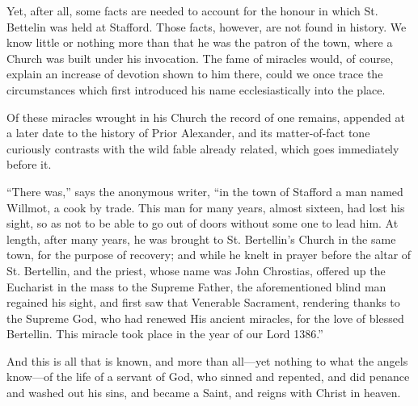 Yet, after all, some facts are needed to account
for the honour in which St. Bettelin was held at Stafford. Those
facts, however, are not found in history. We know little or nothing
more than that he was the patron of the town, where a Church was built
under his invocation. The fame of miracles would, of course, explain
an increase of devotion shown to him there, could we once trace the
circumstances which first introduced his name ecclesiastically into
the place.

Of these miracles wrought in his Church the
record of one remains, appended at a later date to the history of
Prior Alexander, and its matter-of-fact tone curiously contrasts with
the wild fable already related, which goes immediately before it.

``There was,'' says the anonymous writer,
``in the town of Stafford a man named Willmot, a cook by trade. This
man for many years, almost sixteen, had lost his sight, so as not to
be able to go out of doors without some one to lead him. At length,
after many years, he was brought to St. Bertellin's Church in the same
town, for the purpose of recovery; and while he knelt in prayer before
the altar of St. Bertellin, and the priest, whose name was John
Chrostias, offered up the Eucharist in the mass to the Supreme Father,
the aforementioned blind man regained his sight, and first saw that
Venerable Sacrament, rendering thanks to the Supreme God, who had
renewed His ancient miracles, for the love of blessed Bertellin. This
miracle took place in the year of our Lord 1386.''

And this is all that is known, and more than
all—yet nothing to what the angels know—of the life of a servant
of God, who sinned and repented, and did penance and washed out his
sins, and became a Saint, and reigns with Christ in heaven.
